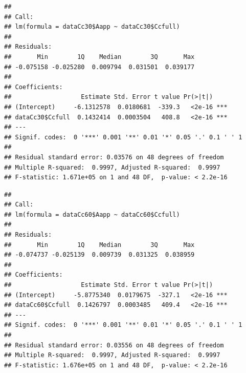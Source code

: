 \documentclass[
]{krantz}
\makeatletter
\newenvironment{Shaded}{\begin{snugshade}}{\end{snugshade}}
\newcommand{\DecValTok}[1]{\textcolor[rgb]{0.00,0.00,0.81}{#1}}
\newcommand{\FunctionTok}[1]{\textcolor[rgb]{0.00,0.00,0.00}{#1}}
\newcommand{\NormalTok}[1]{#1}
\newcommand{\OtherTok}[1]{\textcolor[rgb]{0.56,0.35,0.01}{#1}}
\newcommand{\SpecialCharTok}[1]{\textcolor[rgb]{0.00,0.00,0.00}{#1}}
\newenvironment{kframe}{%
\medskip{}
\setlength{\fboxsep}{.8em}
 \def\at@end@of@kframe{}%
 \ifinner\ifhmode%
  \def\at@end@of@kframe{\end{minipage}}%
  \begin{minipage}{\columnwidth}%
 \fi\fi%
 \def\FrameCommand##1{\hskip\@totalleftmargin \hskip-\fboxsep
 \colorbox{shadecolor}{##1}\hskip-\fboxsep
     \hskip-\linewidth \hskip-\@totalleftmargin \hskip\columnwidth}%
 \MakeFramed {\advance\hsize-\width
   \@totalleftmargin\z@ \linewidth\hsize
   \@setminipage}}%
 {\par\unskip\endMakeFramed%
 \at@end@of@kframe}
\renewenvironment{Shaded}{\begin{kframe}}{\end{kframe}}
\makeatother
\begin{document}
\begin{verbatim}
## 
## Call:
## lm(formula = dataCc30$Aapp ~ dataCc30$Ccfull)
## 
## Residuals:
##       Min        1Q    Median        3Q       Max 
## -0.075158 -0.025280  0.009794  0.031501  0.039177 
## 
## Coefficients:
##                   Estimate Std. Error t value Pr(>|t|)    
## (Intercept)     -6.1312578  0.0180681  -339.3   <2e-16 ***
## dataCc30$Ccfull  0.1432414  0.0003504   408.8   <2e-16 ***
## ---
## Signif. codes:  0 '***' 0.001 '**' 0.01 '*' 0.05 '.' 0.1 ' ' 1
## 
## Residual standard error: 0.03576 on 48 degrees of freedom
## Multiple R-squared:  0.9997, Adjusted R-squared:  0.9997 
## F-statistic: 1.671e+05 on 1 and 48 DF,  p-value: < 2.2e-16
\end{verbatim}

\begin{Shaded}
\end{Shaded}

\begin{verbatim}
## 
## Call:
## lm(formula = dataCc60$Aapp ~ dataCc60$Ccfull)
## 
## Residuals:
##       Min        1Q    Median        3Q       Max 
## -0.074737 -0.025139  0.009739  0.031325  0.038959 
## 
## Coefficients:
##                   Estimate Std. Error t value Pr(>|t|)    
## (Intercept)     -5.8775340  0.0179675  -327.1   <2e-16 ***
## dataCc60$Ccfull  0.1426797  0.0003485   409.4   <2e-16 ***
## ---
## Signif. codes:  0 '***' 0.001 '**' 0.01 '*' 0.05 '.' 0.1 ' ' 1
## 
## Residual standard error: 0.03556 on 48 degrees of freedom
## Multiple R-squared:  0.9997, Adjusted R-squared:  0.9997 
## F-statistic: 1.676e+05 on 1 and 48 DF,  p-value: < 2.2e-16
\end{verbatim}

\begin{Shaded}
\end{Shaded}
\end{document}
